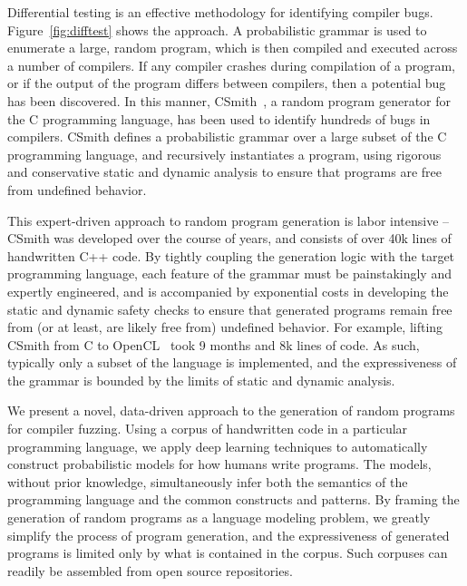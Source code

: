 Differential testing is an effective methodology for identifying compiler bugs. Figure~\ref{fig:difftest} shows the approach. A probabilistic grammar is used to enumerate a large, random program, which is then compiled and executed across a number of compilers. If any compiler crashes during compilation of a program, or if the output of the program differs between compilers, then a potential bug has been discovered. In this manner, CSmith~\cite{Yang2011}, a random program generator for the C programming language, has been used to identify hundreds of bugs in compilers. CSmith defines a probabilistic grammar over a large subset of the C programming language, and recursively instantiates a program, using rigorous and conservative static and dynamic analysis to ensure that programs are free from undefined behavior.

This expert-driven approach to random program generation is labor intensive -- CSmith was developed over the course of years, and consists of over 40k lines of handwritten C++ code. By tightly coupling the generation logic with the target programming language, each feature of the grammar must be painstakingly and expertly engineered, and is accompanied by exponential costs in developing the static and dynamic safety checks to ensure that generated programs remain free from (or at least, are likely free from) undefined behavior. For example, lifting CSmith from C to OpenCL~\cite{Lidbury2015a} took 9 months and 8k lines of code. As such, typically only a subset of the language is implemented, and the expressiveness of the grammar is bounded by the limits of static and dynamic analysis.  

We present a novel, data-driven approach to the generation of random programs for compiler fuzzing. Using a corpus of handwritten code in a particular programming language, we apply deep learning techniques to automatically construct probabilistic models for how humans write programs. The models, without prior knowledge, simultaneously infer both the semantics of the programming language and the common constructs and patterns. By framing the generation of random programs as a language modeling problem, we greatly simplify the process of program generation, and the expressiveness of generated programs is limited only by what is contained in the corpus. Such corpuses can readily be assembled from open source repositories.

